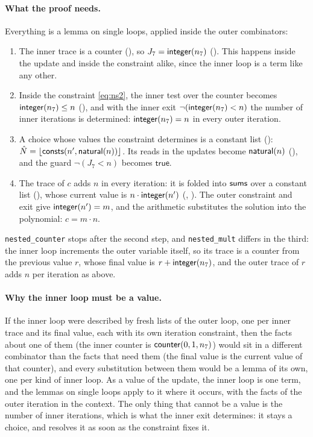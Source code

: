 \paragraph{What the proof needs.} Everything is a lemma on single loops, applied inside the outer combinators:
\begin{enumerate}[nosep]
\item The inner trace is a counter (), so $J_7 = \mathsf{integer}(n_7)$ ().
  This happens inside the update and inside the constraint alike, since the inner loop is a term like any
  other.
\item Inside the constraint \eqref{eq:ns2}, the inner test over the counter becomes $\mathsf{integer}(n_7) \le n$
  (), and with the inner exit $\neg(\mathsf{integer}(n_7) < n)$ the number of
  inner iterations is determined: $\mathsf{integer}(n_7) = n$ in every outer iteration.
\item A choice whose values the constraint determines is a constant list ():
  $\hat{N} = \lfloor \mathsf{consts}(n', \mathsf{natural}(n))\rfloor$. Its reads in the updates become $\mathsf{natural}(n)$
  (), and the guard $\neg(J_7 < n)$ becomes $\mathsf{true}$.
\item The trace of $c$ adds $n$ in every iteration: it is folded into $\mathsf{sums}$ over a constant list
  (), whose current value is $n \cdot \mathsf{integer}(n')$ (, ). The
  outer constraint and exit give $\mathsf{integer}(n') = m$, and the arithmetic substitutes the solution into the
  polynomial: $c = m \cdot n$.
\end{enumerate}
\texttt{nested\_counter} stops after the second step, and \texttt{nested\_mult} differs in the third: the inner
loop increments the outer variable itself, so its trace is a counter from the previous value $r$, whose final
value is $r + \mathsf{integer}(n_7)$, and the outer trace of $r$ adds $n$ per iteration as above.

\paragraph{Why the inner loop must be a value.} If the inner loop were described by fresh lists of the outer
loop, one per inner trace and its final value, each with its own iteration constraint, then the facts about
one of them (the inner counter is $\mathsf{counter}(0, 1, n_7)$) would sit in a different combinator than the facts that
need them (the final value is the current value of that counter), and every substitution between them would
be a lemma of its own, one per kind of inner loop. As a value of the update, the inner loop is one term, and
the lemmas on single loops apply to it where it occurs, with the facts of the outer iteration in the context.
The only thing that cannot be a value is the number of inner iterations, which is what the inner exit
determines: it stays a choice, and  resolves it as soon as the constraint fixes it.

